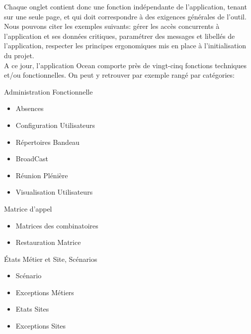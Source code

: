 \documentclass{rapport}
\begin{document}
Chaque onglet contient donc une fonction indépendante de l'application, tenant sur une seule page, et qui doit correspondre à des exigences générales de l'outil. Nous pouvons citer les exemples suivants: gérer les accès concurrents à l'application et ses données critiques, paramétrer des messages et libellés de l'application, respecter les principes ergonomiques mis en place à l'initialisation du projet.\\

A ce jour, l'application Ocean comporte près de vingt-cinq fonctions techniques et/ou fonctionnelles. On peut y retrouver par exemple rangé par catégories:

\vspace{5mm} %
\begin{itemize}

\begin{minipage}{0.5\textwidth}
\item Administration Fonctionnelle
        \begin{itemize}
        \item Absences
        \item Configuration Utilisateurs
        \item Répertoires Bandeau
        \item BroadCast
        \item Réunion Plénière
        \item Visualisation Utilisateurs
        \end{itemize}
    \vspace{5mm} %
    \item Matrice d'appel
        \begin{itemize}
        \item Matrices des combinatoires
        \item Restauration Matrice
        \end{itemize}
    \vspace{5mm} %
    \item États Métier et Site, Scénarios
        \begin{itemize}
        \item Scénario
        \item Exceptions Métiers
        \item Etats Sites
        \item Exceptions Sites
        \end{itemize}
\end{minipage}

\end{itemize}
\end{document}
